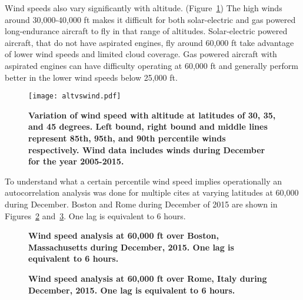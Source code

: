 \documentclass[]{aiaa-tc}%
\begin{document}
Wind speeds also vary significantly with altitude. (Figure~\ref{f:altvswind})
The high winds around 30,000-40,000 ft makes it difficult for both solar-electric and gas powered long-endurance aircraft to fly in that range of altitudes.  
Solar-electric powered aircraft, that do not have aspirated engines, fly around 60,000 ft take advantage of lower wind speeds and limited cloud coverage.
Gas powered aircraft with aspirated engines can have difficulty operating at 60,000 ft and generally perform better in the lower wind speeds below 25,000 ft.

\begin{figure}[H]
	\begin{center}
	\texttt{[image: altvswind.pdf]}
    \caption{ \textbf{ Variation of wind speed with altitude at latitudes of 30, 35, and 45 degrees.  Left bound, right bound and middle lines represent 85th, 95th, and 90th percentile winds respectively. Wind data includes winds during December for the year 2005-2015.}}
	\label{f:altvswind}
	\end{center}
\end{figure}

To understand what a certain percentile wind speed implies operationally an autocorrelation analysis was done for multiple cites at varying latitudes at 60,000 during December. 
Boston and Rome during December of 2015 are shown in Figures~\ref{f:bostonwinds} and~\ref{f:romewinds}. 
One lag is equivalent to 6 hours. 

\begin{figure}[H]
 \begin{subfigmatrix}{2}%
 \end{subfigmatrix}
 \caption{\textbf{Wind speed analysis at 60,000 ft over Boston, Massachusetts during December, 2015. One lag is equivalent to 6 hours. }}
 \label{f:bostonwinds}
\end{figure}

\begin{figure}[H]
 \begin{subfigmatrix}{2}%
 \end{subfigmatrix}
 \caption{\textbf{Wind speed analysis at 60,000 ft over Rome, Italy during December, 2015. One lag is equivalent to 6 hours. }}
 \label{f:romewinds}
\end{figure}
\end{document}
